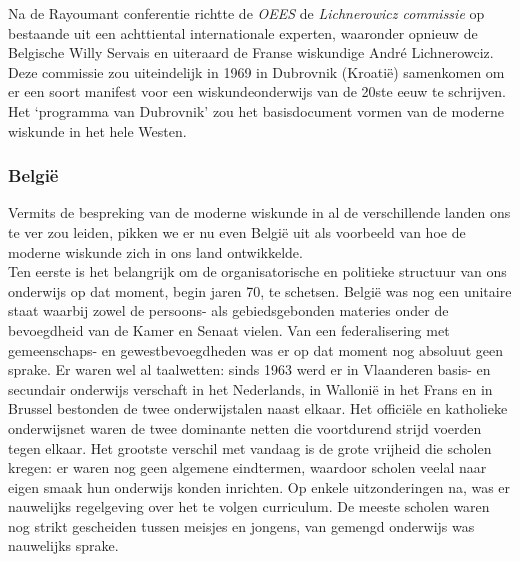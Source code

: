 \documentclass[a4paper,11pt]{article}
\begin{document}
\noindent Na de Rayoumant conferentie richtte de \textit{OEES} de \textit{Lichnerowicz commissie} op 
bestaande uit
een achttiental internationale experten, waaronder opnieuw de Belgische Willy Servais en uiteraard de Franse wiskundige André Lichnerowciz. Deze commissie 
zou uiteindelijk in 1969 in Dubrovnik (Kroatië) samenkomen om er een soort manifest 
voor een wiskundeonderwijs van de 20ste eeuw te schrijven. Het `programma van Dubrovnik' zou 
het basisdocument vormen van de moderne wiskunde in het hele Westen.
\subsubsection{België}
Vermits de bespreking van de moderne wiskunde in al de verschillende landen ons te 
ver zou leiden, pikken we er nu even België uit als voorbeeld van hoe de moderne 
wiskunde zich in ons land ontwikkelde.\\

\noindent Ten eerste is het belangrijk om de organisatorische en politieke structuur van ons onderwijs 
op dat moment, begin jaren 70, te schetsen. België was nog een unitaire staat waarbij 
zowel de persoons- als gebiedsgebonden materies onder de bevoegdheid van de 
Kamer en Senaat vielen. Van een federalisering met gemeenschaps- en 
gewestbevoegdheden was er op dat moment nog absoluut geen sprake. Er waren wel al taalwetten: sinds 1963 werd er in Vlaanderen basis- en 
secundair onderwijs verschaft in het Nederlands, in Wallonië in het  
Frans en in Brussel bestonden de twee onderwijstalen naast elkaar. Het officiële 
en katholieke onderwijsnet waren de twee dominante netten die voortdurend strijd 
voerden tegen elkaar. Het grootste verschil met vandaag is de grote vrijheid die scholen kregen:
er waren nog geen algemene eindtermen, waardoor scholen veelal naar eigen smaak 
hun onderwijs konden inrichten. Op enkele uitzonderingen na, was er nauwelijks regelgeving over het te volgen curriculum. De meeste scholen waren nog strikt gescheiden 
tussen meisjes en jongens, van gemengd onderwijs was nauwelijks sprake.\\
\end{document}
